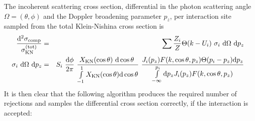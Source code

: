 The incoherent scattering cross section, differential in 
the photon scattering angle $\Omega = (\theta,\phi)$ 
and the Doppler broadening 
parameter $p_z$, per interaction site sampled from the 
total Klein-Nishina cross section is
\begin{eqnarray}
{{\rm d}^2 \sigma_{\rm comp} \over \sigma_{\rm KN}^{\rm (tot)}} & = &
\sum \frac{Z_i}{Z} \Theta(k - U_i)~ \sigma_i~ {\rm d} \Omega~ {\rm d} p_z 
\\ 
\sigma_i~ {\rm d} \Omega~ {\rm d} p_z & = & 
S_i~
{{\rm d} \phi \over 2 \pi}~
{X_{\rm KN}(\cos \theta)~{\rm d} \cos \theta~ \over 
\int\limits_{-1}^1 X_{\rm KN}(\cos \theta) {\rm d} \cos \theta } 
~{ J_i(p_z) F(k,\cos \theta,p_z) \Theta(p_i - p_z) {\rm d} p_z \over 
\int\limits_{-\infty}^{p_i} {\rm d} p_z J_i(p_z) F(k,\cos \theta,p_z) }
\nonumber 
\end{eqnarray}
It is then clear that the following algorithm produces the 
required number of rejections and samples the differential 
cross section correctly, if the interaction is accepted:
